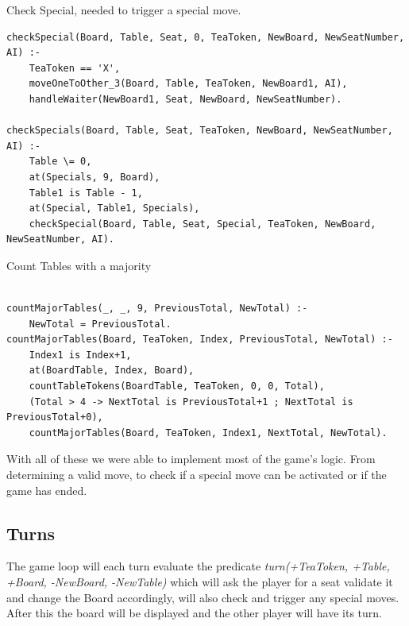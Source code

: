 \documentclass[a4paper]{article}
\begin{document}
        \begin{listing}[H]
        \caption{Check Special, needed to trigger a special move.}
        \label{Codigo:cod_chekspecial}
        \begin{verbatim}
checkSpecial(Board, Table, Seat, 0, TeaToken, NewBoard, NewSeatNumber, AI) :-
    TeaToken == 'X',
    moveOneToOther_3(Board, Table, TeaToken, NewBoard1, AI),
    handleWaiter(NewBoard1, Seat, NewBoard, NewSeatNumber).

checkSpecials(Board, Table, Seat, TeaToken, NewBoard, NewSeatNumber, AI) :-
    Table \= 0,
    at(Specials, 9, Board),
    Table1 is Table - 1,
    at(Special, Table1, Specials),
    checkSpecial(Board, Table, Seat, Special, TeaToken, NewBoard, NewSeatNumber, AI).
        \end{verbatim}

        \end{listing}

        \begin{listing}[H]
        \caption{Count Tables with a majority}
        \label{Codigo:cod_major}
        \begin{verbatim}

countMajorTables(_, _, 9, PreviousTotal, NewTotal) :-
    NewTotal = PreviousTotal.
countMajorTables(Board, TeaToken, Index, PreviousTotal, NewTotal) :-
    Index1 is Index+1,
    at(BoardTable, Index, Board),
    countTableTokens(BoardTable, TeaToken, 0, 0, Total),
    (Total > 4 -> NextTotal is PreviousTotal+1 ; NextTotal is PreviousTotal+0),
    countMajorTables(Board, TeaToken, Index1, NextTotal, NewTotal).

        \end{verbatim}

        \end{listing}


With all of these we were able to implement most of the game's logic. From determining a valid move,
to check if a special move can be activated or if the game has ended.


\subsection{Turns}

The game loop will each turn evaluate the predicate \textit{turn(+TeaToken, +Table, +Board, -NewBoard, -NewTable)}
 which will ask the player for a seat validate it and change the Board accordingly, will also check and trigger any special moves.
  After this the board will be displayed
  and the other player will have its turn.
\end{document}
